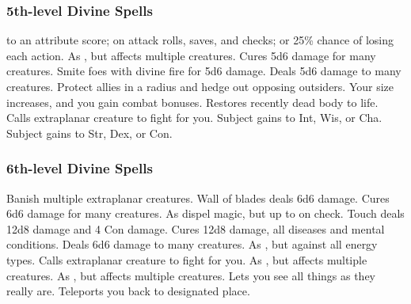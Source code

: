 \subsubsection{5th-level Divine Spells}
\begin{spelllist}
      to an attribute score;  on attack rolls, saves, and checks; or 25\% chance of losing each action.
     As , but affects multiple creatures.
     Cures 5d6 damage for many creatures.
     Smite foes with divine fire for 5d6 damage.
     Deals 5d6 damage to many creatures.
     Protect allies in a \areamed radius and hedge out opposing outsiders.
     Your size increases, and you gain combat bonuses.
     Restores recently dead body to life.
     Calls extraplanar creature to fight for you.
     Subject gains  to Int, Wis, or Cha.
     Subject gains  to Str, Dex, or Con.
\end{spelllist}

\subsubsection{6th-level Divine Spells}
\begin{spelllist}
     Banish multiple extraplanar creatures. 
     Wall of blades deals 6d6 damage.
     Cures 6d6 damage for many creatures.
     As dispel magic, but up to  on check.
     Touch deals 12d8 damage and 4 Con damage.
     Cures 12d8 damage, all diseases and mental conditions.
     Deals 6d6 damage to many creatures.
     As , but against all energy types.
     Calls extraplanar creature to fight for you.
     As , but affects multiple creatures.
     As , but affects multiple creatures.
    \M Lets you see all things as they really are.
     Teleports you back to designated place.
\end{spelllist}

